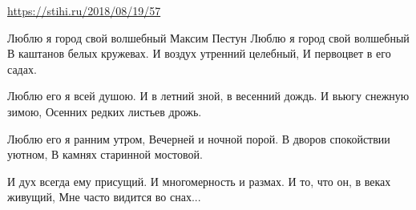  
 
 
 
 
\url{https://stihi.ru/2018/08/19/57}

Люблю я город свой волшебный
Максим Пестун
Люблю я город свой волшебный
В каштанов белых кружевах.
И воздух утренний целебный,
И первоцвет в его садах.

Люблю его я всей душою.
И в летний зной, в весенний дождь.
И вьюгу снежную зимою,
Осенних редких листьев дрожь.

Люблю его я ранним утром,
Вечерней и ночной порой.
В дворов спокойствии уютном,
В камнях старинной мостовой.

И дух всегда ему присущий.
И многомерность и размах.
И то, что он, в веках живущий,
Мне часто видится во снах...

